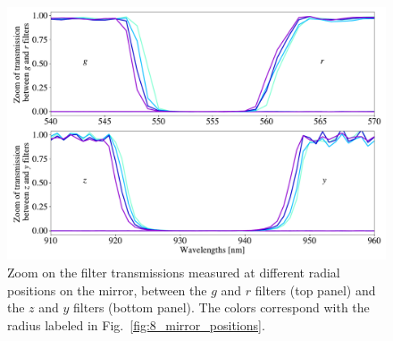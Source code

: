 \begin{figure}%
    \centering
    \includegraphics[width=1\columnwidth]{fig/blue_shift_filter_edges.pdf}
    \caption{Zoom on the \SD filter transmissions measured at different radial positions on the mirror, between the $g$ and $r$ filters (top panel) and the $z$ and $y$ filters (bottom panel). The colors correspond with the radius labeled in Fig.~\ref{fig:8_mirror_positions}.}
    \label{fig:blueshift}
\end{figure}

%
%









	